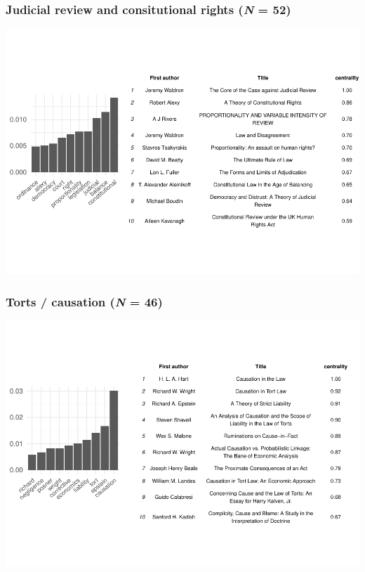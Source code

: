 \documentclass[
]{article}
\begin{document}
\hypertarget{judicial-review-and-consitutional-rights-n-52}{%
\subsubsection{\texorpdfstring{Judicial review and consitutional rights (\emph{N} = 52)}{Judicial review and consitutional rights (N = 52)}}\label{judicial-review-and-consitutional-rights-n-52}}

\begin{flushright}\includegraphics{paper_files/figure-latex/JR-1} \end{flushright}

\hypertarget{torts-causation-n-46}{%
\subsubsection{\texorpdfstring{Torts / causation (\emph{N} = 46)}{Torts / causation (N = 46)}}\label{torts-causation-n-46}}

\begin{flushright}\includegraphics{paper_files/figure-latex/TC-1} \end{flushright}
\end{document}

